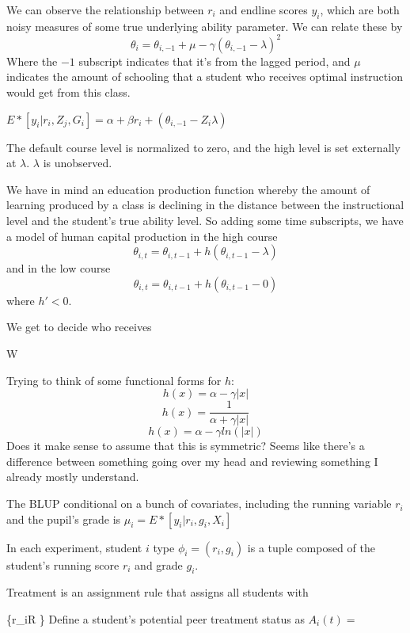 \documentclass[10pt]{article}
\begin{document}
We can observe the relationship between $r_i$ and endline scores $y_i$, which are both noisy measures of some true underlying ability parameter. We can relate these by
$$ \theta_{i} = \theta_{i,-1} + \mu - \gamma (\theta_{i,-1} - \lambda)^2 $$
Where the $-1$ subscript indicates that it's from the lagged period, and $\mu$ indicates the amount of schooling that a student who receives optimal instruction would get from this class. 

$E*[y_i|r_i,Z_j,G_i] = \alpha + \beta r_i + (\theta_{i,-1} - Z_i \lambda)$


The default course level is normalized to zero, and the high level is set externally at $\lambda$. $\lambda$ is unobserved.

We have in mind an education production function whereby the amount of learning produced by a class is declining in the distance between the instructional level and the student's true ability level. So adding some time subscripts, we have a model of human capital production in the high course
$$\theta_{i,t} = \theta_{i,t-1}+h(\theta_{i,t-1} - \lambda)$$
and in the low course
$$\theta_{i,t} = \theta_{i,t-1}+h(\theta_{i,t-1} - 0)$$
where $h'<0$. 


We get to decide who receives 

W




Trying to think of some functional forms for $h$: 
$$h(x) = \alpha-\gamma|x|$$
$$h(x) = \frac{1}{\alpha + \gamma |x|}$$
$$h(x) = \alpha - \gamma ln(|x|)$$
Does it make sense to assume that this is symmetric? Seems like there's a difference between something going over my head and reviewing something I already mostly understand.

The BLUP conditional on a bunch of covariates, including the running variable $r_i$ and the pupil's grade is
$\mu_i=E*[y_i|r_i,g_i,X_i]$

In each experiment, student $i$ type $\phi_i = (r_i,g_i)$ is a tuple composed of the student's running score $r_i$ and grade $g_i$. 

Treatment is an assignment rule that assigns all students with 

\sum {}\{r_i\in R \}
Define a student's potential peer treatment status as $A_i(t) = $
\end{document}
